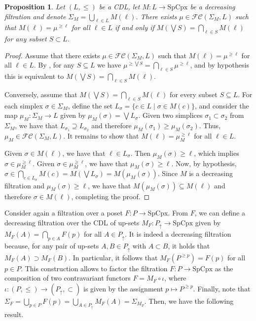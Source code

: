\documentclass[a4paper,10pt]{article}
\newtheorem{proposition}[theorem]{Proposition}
\newcommand{\calfc}{\mathcal{FC}}
\newcommand{\SpCpx}{\textrm{SpCpx}}
\begin{document}
\begin{proposition}\label{prop:filtration-fuzzy-characterisation}
Let \((L,\leq)\) be a CDL, let \(M\colon L\rightarrow \SpCpx\) be a decreasing filtration and denote $\Sigma_M=\bigcup_{\ell\in L}M(\ell)$. 
There exists \(\mu \in \calfc(\Sigma_M,L)\) such that $M(\ell) = \mu^{\geq \ell}$ for all $\ell \in L$ if and only if $M(\bigvee S)=\bigcap_{\ell\in S} M(\ell)$ for any subset $S \subset L$.
\end{proposition}
\begin{proof}
Assume that there exists \(\mu \in \calfc(\Sigma_M,L)\) such that $M(\ell) = \mu^{\geq \ell}$ for all $\ell \in L$. 
By , for any \(S \subseteq L\) we have \(\mu^{\geq \bigvee S} = \bigcap_{\ell \in S}\mu^{\geq \ell}\), and by hypothesis this is equivalent to \(M(\bigvee S) = \bigcap_{\ell \in S} M(\ell)\).

Conversely, assume that \(M(\bigvee S) = \bigcap_{\ell \in S} M(\ell)\) for every subset \(S \subseteq L\).  
For each simplex \(\sigma \in \Sigma_M\), define the set \(L_{\sigma} = \{c \in L \mid \sigma \in M(c)\}\), and consider the map \(\mu_M : \Sigma_M \to L\) given by \(\mu_M(\sigma) = \bigvee L_{\sigma}\). Given two simplices $\sigma_1 \subset \sigma_2$ from $\Sigma_M$, we have that \(L_{\sigma_1} \supseteq L_{\sigma_2}\) and therefore $\mu_M(\sigma_1) \geq \mu_M(\sigma_2)$. Thus, $\mu_M \in \calfc(\Sigma_M,L)$. It remains to show that $M(\ell) = \mu_M^{\geq \ell}$ for all $\ell \in L$. 

Given $\sigma \in M(\ell)$, we have that \(\ell \in L_{\sigma}\). Then $\mu_M(\sigma)\geq \ell$, which implies $\sigma \in \mu_M^{\geq \ell}$.
Given $\sigma \in \mu_M^{\geq \ell}$, we have that $\mu_M(\sigma)\geq \ell$. Now, by hypothesis, 
\(\sigma \in \bigcap_{c \in L_{\sigma}} M(c)=M(\bigvee L_{\sigma})=M(\mu_M(\sigma))\). Since \(M\) is a decreasing filtration and $\mu_M(\sigma)\geq \ell$, we have that \(M(\mu_M(\sigma))\subseteq M(\ell)\) and therefore \(\sigma \in M(\ell)\), completing the proof.
\end{proof}

Consider again a filtration over a poset $F\colon P\rightarrow \SpCpx$.
From $F$, we can define a decreasing filtration over the CDL of up-sets $M_F\colon P_\uparrow \rightarrow \SpCpx$ given by $M_F(A) = \bigcap_{p \in A}F(p)$ for all $A \in P_\uparrow$.
It is indeed a decreasing filtration because, for any pair of up-sets $A,B \in P_\uparrow$ with $A \subset B$, it holds that $M_F(A) \supset M_F(B)$.
In particular, it follows that $M_F(P ^{\geq p} ) = F(p)$ for all $p \in P$.
This construction allows to factor the filtration $F\colon P \rightarrow \SpCpx$ as the composition of two contravariant functors $F=M_F \circ \iota $, where $\iota \colon (P, \leq)\rightarrow (P_\uparrow, \subset)$ is given by the assignment $p\mapsto P^{\geq p}$.
Finally, note that $\Sigma_F = \bigcup_{p \in P} F(p)= \bigcup_{A \in P_\uparrow} M_F(A) = \Sigma_{M_F}$.
Then, we have the following result.
\end{document}
